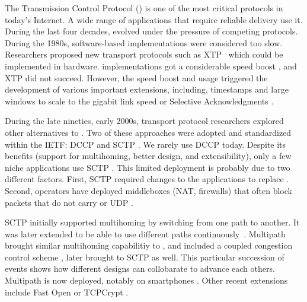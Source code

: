 
The Transmission Control Protocol (\tcp) \cite{rfc793}
is one of the most critical protocols in today's Internet.
A wide range of applications that require reliable delivery use it. During the
last four decades, \tcp
evolved under the pressure of competing protocols. During the 1980s,
software-based \tcp implementations were considered too slow. Researchers
proposed new transport protocols such as XTP~\cite{sanders1990xpress}
which could be implemented in hardware. \tcp implementations got
a considerable speed boost \cite{clark1989analysis}, and XTP did not succeed.  However,
the \tcp speed boost and usage triggered the development of various important \tcp
extensions, including,
timestamps and large windows \cite{rfc1323} to scale to the gigabit link speed
or Selective Acknowledgments \cite{rfc2018}.

During the late nineties, early 2000s, transport protocol researchers
explored other alternatives to \tcp. Two of these approaches were adopted
and standardized within the IETF: DCCP \cite{kohler2006designing} and
SCTP \cite{rfc4960}. We rarely use DCCP today. Despite its benefits
(support for multihoming, better design, and extensibility), only a few niche
applications use SCTP \cite{budzisz2012taxonomy}.
This limited deployment is probably due
to two different factors. First, SCTP required changes to the applications to
replace \tcp. Second, operators have deployed middleboxes (NAT, firewalls) that
often block packets that do not carry \tcp or UDP \cite{honda2011still}. 

SCTP initially supported multihoming by switching from one path to another. It
was later extended to be able to use different paths
continuously~\cite{iyengar2006concurrent}.  Multipath \tcp \cite{rfc6824,raiciu2012hard}
brought similar multihoming capabilitiy to \tcp, and included a coupled congestion control
scheme \cite{wischik2011design}, later brought to SCTP as well. This particular
succession of events shows how
different designs can collobarate to advance each others.  Multipath \tcp is now deployed, notably on
smartphones \cite{bonaventure2016multipath}. Other recent \tcp extensions include
\tcp Fast Open \cite{rfc7413} or TCPCrypt \cite{rfc8548}.
 

